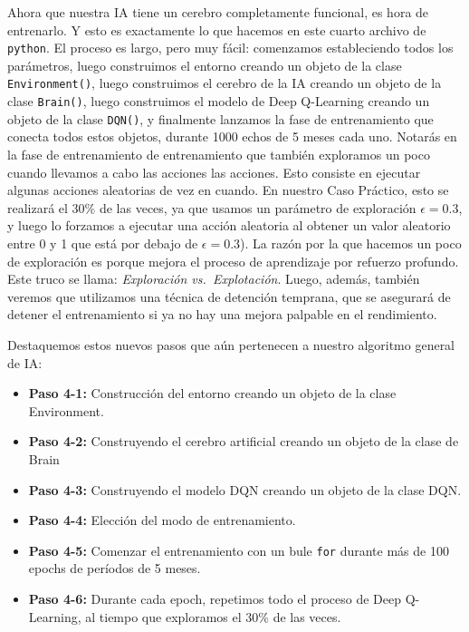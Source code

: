 \documentclass[
]{book}
\providecommand{\tightlist}{%
  \setlength{\itemsep}{0pt}\setlength{\parskip}{0pt}}
\begin{document}
Ahora que nuestra IA tiene un cerebro completamente funcional, es hora de entrenarlo. Y esto es exactamente lo que hacemos en este cuarto archivo de \texttt{python}. El proceso es largo, pero muy fácil: comenzamos estableciendo todos los parámetros, luego construimos el entorno creando un objeto de la clase \texttt{Environment()}, luego construimos el cerebro de la IA creando un objeto de la clase \texttt{Brain()}, luego construimos el modelo de Deep Q-Learning creando un objeto de la clase \texttt{DQN()}, y finalmente lanzamos la fase de entrenamiento que conecta todos estos objetos, durante 1000 echos de 5 meses cada uno. Notarás en la fase de entrenamiento de entrenamiento que también exploramos un poco cuando llevamos a cabo las acciones las acciones. Esto consiste en ejecutar algunas acciones aleatorias de vez en cuando. En nuestro Caso Práctico, esto se realizará el 30\% de las veces, ya que usamos un parámetro de exploración \(\epsilon = 0.3\), y luego lo forzamos a ejecutar una acción aleatoria al obtener un valor aleatorio entre 0 y 1 que está por debajo de \(\epsilon = 0.3\)). La razón por la que hacemos un poco de exploración es porque mejora el proceso de aprendizaje por refuerzo profundo. Este truco se llama: \emph{Exploración vs.~Explotación}. Luego, además, también veremos que utilizamos una técnica de detención temprana, que se asegurará de detener el entrenamiento si ya no hay una mejora palpable en el rendimiento.

Destaquemos estos nuevos pasos que aún pertenecen a nuestro algoritmo general de IA:

\begin{itemize}
\tightlist
\item
  \textbf{Paso 4-1:} Construcción del entorno creando un objeto de la clase Environment.
\item
  \textbf{Paso 4-2:} Construyendo el cerebro artificial creando un objeto de la clase de Brain
\item
  \textbf{Paso 4-3:} Construyendo el modelo DQN creando un objeto de la clase DQN.
\item
  \textbf{Paso 4-4:} Elección del modo de entrenamiento.
\item
  \textbf{Paso 4-5:} Comenzar el entrenamiento con un bule \texttt{for} durante más de 100 epochs de períodos de 5 meses.
\item
  \textbf{Paso 4-6:} Durante cada epoch, repetimos todo el proceso de Deep Q-Learning, al tiempo que exploramos el 30\% de las veces.
\end{itemize}
\end{document}
